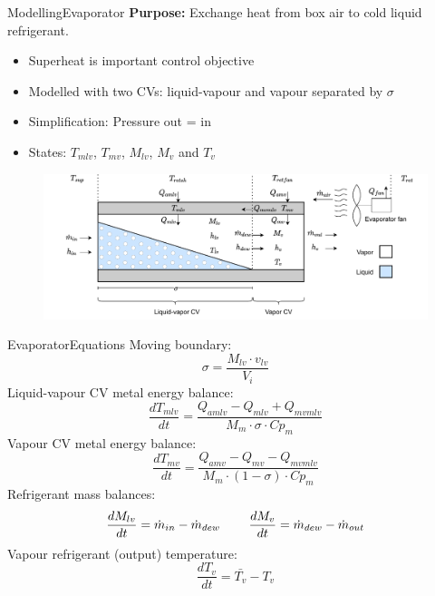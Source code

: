 \begin{frame}{Modelling}{Evaporator}
	\textbf{Purpose:} Exchange heat from box air to cold liquid refrigerant.
	\begin{itemize}
		\item Superheat is important control objective
		\item Modelled with two CVs: liquid-vapour and vapour separated by $\sigma$
		\item Simplification: Pressure out = in
		\item States: $T_{mlv}$, $T_{mv}$, $M_{lv}$, $M_{v}$ and $T_{v}$
	\end{itemize}
	
	\vspace{0.4cm}
	\begin{figure}[h!]
		\centering
		\includegraphics[width=1\textwidth]{../Graphics/Evaporator_CV_diagram.pdf}
		\label{fig:evap_CV}
	\end{figure}

\end{frame}

\begin{frame}{Evaporator}{Equations}
	Moving boundary:
	\begin{equation}
		\sigma = \frac{M_{lv} \cdot v_{lv}}{V_i} \label{eq:Evaporator_boundary}
	\end{equation}
	Liquid-vapour CV metal energy balance:
	\begin{equation}
		\frac{dT_{mlv}}{dt}  = \frac{Q_{amlv}-Q_{mlv} + Q_{mvmlv}}{M_m \cdot \sigma \cdot Cp_m} \label{eq:evap_dT_ml}
	\end{equation}
	Vapour CV metal energy balance:
	\begin{equation}
		\frac{dT_{mv}}{dt} = \frac{Q_{amv} - Q_{mv} - Q_{mvmlv}}{M_m \cdot (1 - \sigma) \cdot Cp_m} \label{eq:evap_dT_mv}
	\end{equation}
	Refrigerant mass balances:
	\begin{equation} \label{eq:evap_dMlv}
		\frac{dM_{lv}}{dt} = \dot{m}_{in} - \dot{m}_{dew} \hspace{0.8cm}  \frac{dM_v}{dt} = \dot{m}_{dew} - \dot{m}_{out}
	\end{equation}
	Vapour refrigerant (output) temperature:
	\begin{equation}\label{eq:tv_initial}
		\frac{dT_{v}}{dt} = \bar{T_v} - T_v
	\end{equation}

\end{frame}

